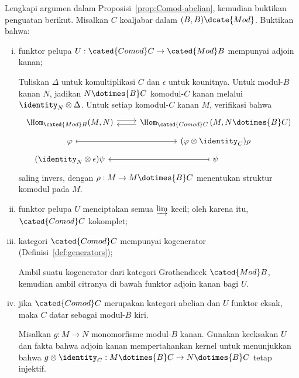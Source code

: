 	\item Lengkapi argumen dalam Proposisi~\ref{prop:Comod-abelian}, kemudian
	buktikan penguatan berikut. Misalkan $C$ koaljabar dalam
	$(B,B)\dcate{Mod}$. Buktikan bahwa:
	\begin{enumerate}[(i)]
		\item funktor pelupa $U:\cated{Comod}C\to\cated{Mod}B$ mempunyai adjoin
		kanan;

		\begin{hint}
			Tuliskan $\Delta$ untuk komultiplikasi $C$ dan $\epsilon$ untuk
			kounitnya. Untuk modul-$B$ kanan $N$, jadikan
			$N\dotimes{B}C$ komodul-$C$ kanan melalui
			$\identity_N\otimes\Delta$. Untuk setiap komodul-$C$ kanan $M$,
			verifikasi bahwa
			\[\begin{tikzcd}[row sep=tiny]
				\Hom_{\cated{Mod}B}(M, N) \arrow[shift left, r] & \Hom_{\cated{Comod}C}\left(M, N \dotimes{B} C\right) \arrow[shift left, l] \\
				\varphi \arrow[mapsto, r] & (\varphi \otimes \identity_C) \rho \\
				(\identity_N \otimes \epsilon) \psi & \psi \arrow[mapsto, l]
			\end{tikzcd}\]
			saling invers, dengan $\rho:M\to M\dotimes{B}C$ menentukan struktur
			komodul pada $M$.
		\end{hint}
		\item funktor pelupa $U$ menciptakan semua $\varinjlim$ kecil; oleh
		karena itu, $\cated{Comod}C$ kokomplet;
		\item kategori $\cated{Comod}C$ mempunyai kogenerator
		(Definisi~\ref{def:generators});

		\begin{hint}
			Ambil suatu kogenerator dari kategori Grothendieck $\cated{Mod}B$,
			kemudian ambil citranya di bawah funktor adjoin kanan bagi $U$.
		\end{hint}
		\item jika $\cated{Comod}C$ merupakan kategori abelian dan $U$ funktor
		eksak, maka $C$ datar sebagai modul-$B$ kiri.

		\begin{hint}
			Misalkan $g:M\to N$ monomorfisme modul-$B$ kanan. Gunakan keeksakan
			$U$ dan fakta bahwa adjoin kanan mempertahankan kernel untuk
			menunjukkan bahwa
			$g\otimes\identity_C:M\dotimes{B}C\to N\dotimes{B}C$ tetap injektif.
		\end{hint}
	\end{enumerate}

